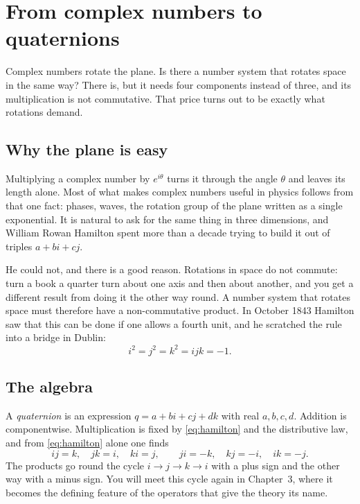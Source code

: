 \chapter{From complex numbers to quaternions}\label{ch:quaternions}

\begin{questionbox}
Complex numbers rotate the plane. Is there a number system that rotates space in the same way? There is, but it needs four components instead of three, and its multiplication is not commutative. That price turns out to be exactly what rotations demand.
\end{questionbox}

\section{Why the plane is easy}

Multiplying a complex number by $e^{i\theta}$ turns it through the angle $\theta$ and leaves its length alone. Most of what makes complex numbers useful in physics follows from that one fact: phases, waves, the rotation group of the plane written as a single exponential. It is natural to ask for the same thing in three dimensions, and William Rowan Hamilton spent more than a decade trying to build it out of triples $a+bi+cj$.

He could not, and there is a good reason. Rotations in space do not commute: turn a book a quarter turn about one axis and then about another, and you get a different result from doing it the other way round. A number system that rotates space must therefore have a non-commutative product. In October 1843 Hamilton saw that this can be done if one allows a fourth unit, and he scratched the rule into a bridge in Dublin:
\begin{equation}\label{eq:hamilton}
i^2=j^2=k^2=ijk=-1 .
\end{equation}

\section{The algebra}

A \emph{quaternion} is an expression $q=a+bi+cj+dk$ with real $a,b,c,d$. Addition is componentwise. Multiplication is fixed by \eqref{eq:hamilton} and the distributive law, and from \eqref{eq:hamilton} alone one finds
\[
ij=k,\quad jk=i,\quad ki=j,\qquad ji=-k,\quad kj=-i,\quad ik=-j .
\]
The products go round the cycle $i\to j\to k\to i$ with a plus sign and the other way with a minus sign. You will meet this cycle again in Chapter~3, where it becomes the defining feature of the operators that give the theory its name.

